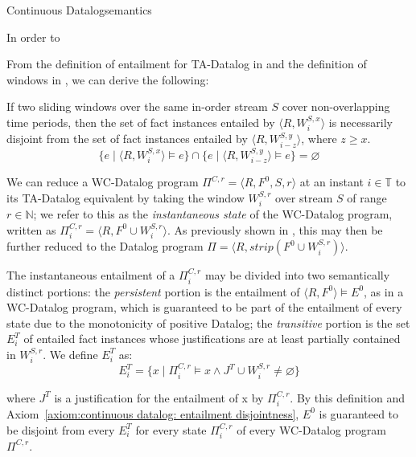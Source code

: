 \begin{nestedsection}{Continuous Datalog}{semantics}
\begin{definition}
In order to 

\end{definition}

From the definition of entailment for TA-Datalog in  and the definition of windows in
, we can derive the following:

\begin{axiom}\label{axiom:continuous datalog: entailment disjointness}

If two sliding windows over the same in-order stream $S$ cover
non-overlapping time periods, then the set of fact instances entailed
by ${\langle R, W^{S,x}_i \rangle}$ is necessarily disjoint from the
set of fact instances entailed by $\langle R, W^{S,y}_{i-z} \rangle$,
where ${z \geq x}$.
\[
\{ e \mid \langle R , W^{S,x}_i \rangle \models e \} \cap \{ e \mid \langle R , W^{S,y}_{i-z} \rangle \models e \} = \varnothing
\]
\end{axiom}

\begin{definition}
\label{def:continuous datalog: CDPt}

We can reduce a WC-Datalog program $\Pi^{C,r} = \langle R, F^0, S, r
\rangle$ at an instant $i \in \mathbb{T}$ to its TA-Datalog equivalent by
taking the window $W^{S,r}_i$ over stream $S$ of range $r \in \mathbb{N}$;
we refer to this as the {\em instantaneous state} of the WC-Datalog program,
written as $\Pi^{C,r}_i = \langle R, F^0 \cup W^{S,r}_i \rangle$. As
previously shown in , this
may then be further reduced to the Datalog program $\Pi = \langle R, strip(F^0 \cup W^{S,r}_i) \rangle$.

The instantaneous entailment of a $\Pi^{C,r}_i$ may be divided into two
semantically distinct portions: the \emph{persistent} portion is the
entailment of ${\langle R, F^0 \rangle \models E^0}$, as in a WC-Datalog
program, which is guaranteed to be part of the entailment of every state
due to the monotonicity of positive Datalog; the \emph{transitive} portion
is the set $E^T_{i}$ of entailed fact instances whose justifications are at
least partially contained in $W^{S,r}_i$. We define $E^T_i$ as:
\[
E^T_i = \{ x \mid \Pi^{C,r}_i \models x \land J^T \cup W^{S,r}_i \neq \varnothing \}
\]

\noindent where $J^T$ is a justification for the entailment of x by
$\Pi^{C,r}_i$. By this definition and Axiom~\ref{axiom:continuous
  datalog: entailment disjointness}, $E^0$ is guaranteed to be
disjoint from every $E^T_i$ for every state $\Pi^{C,r}_i$ of every
WC-Datalog program $\Pi^{C,r}$.
\end{definition}


\end{nestedsection}

